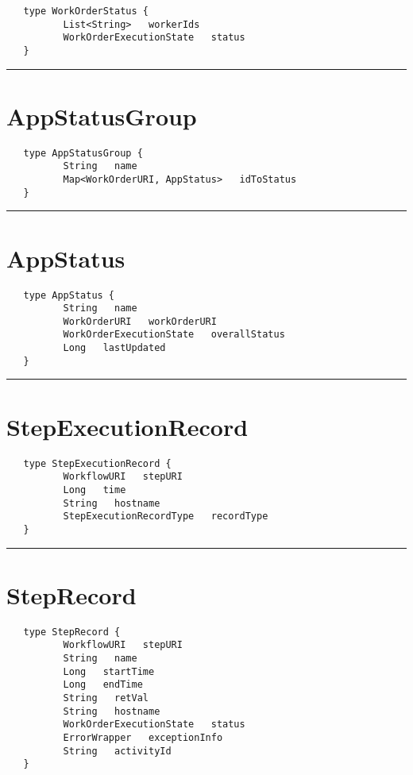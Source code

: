 \begin{Verbatim}
   type WorkOrderStatus {
          List<String>   workerIds
          WorkOrderExecutionState   status
   }
\end{Verbatim}

\rule{12cm}{2pt}
\section{AppStatusGroup}
\label{type:AppStatusGroup}

\begin{Verbatim}
   type AppStatusGroup {
          String   name
          Map<WorkOrderURI, AppStatus>   idToStatus
   }
\end{Verbatim}

\rule{12cm}{2pt}
\section{AppStatus}
\label{type:AppStatus}

\begin{Verbatim}
   type AppStatus {
          String   name
          WorkOrderURI   workOrderURI
          WorkOrderExecutionState   overallStatus
          Long   lastUpdated
   }
\end{Verbatim}

\rule{12cm}{2pt}
\section{StepExecutionRecord}
\label{type:StepExecutionRecord}

\begin{Verbatim}
   type StepExecutionRecord {
          WorkflowURI   stepURI
          Long   time
          String   hostname
          StepExecutionRecordType   recordType
   }
\end{Verbatim}

\rule{12cm}{2pt}
\section{StepRecord}
\label{type:StepRecord}

\begin{Verbatim}
   type StepRecord {
          WorkflowURI   stepURI
          String   name
          Long   startTime
          Long   endTime
          String   retVal
          String   hostname
          WorkOrderExecutionState   status
          ErrorWrapper   exceptionInfo
          String   activityId
   }
\end{Verbatim}

